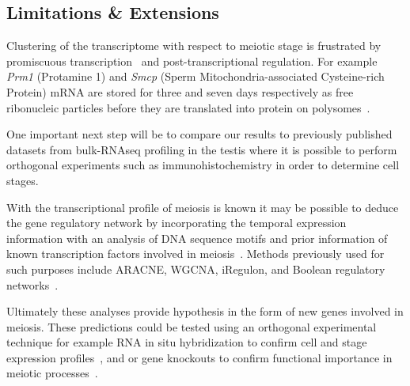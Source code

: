 \subsection{Limitations \& Extensions}
Clustering of the transcriptome with respect to meiotic stage is frustrated by promiscuous transcription~\cite{Soumillon2013Cellular} and post-transcriptional regulation. For example \textit{Prm1} (Protamine 1) and \textit{Smcp} (Sperm Mitochondria-associated Cysteine-rich Protein) mRNA are stored for three and seven days respectively as free ribonucleic particles before they are translated into protein on polysomes~\cite{Cullinane2015Mechanisms, Kleene1984Translational, Kleene2004Patterns}.



One important next step will be to compare our results to previously published datasets from bulk-RNAseq profiling in the testis where it is possible to perform orthogonal experiments such as immunohistochemistry in order to determine cell stages.


With the transcriptional profile of meiosis is known it may be possible to deduce the gene regulatory network by incorporating the temporal expression information with an analysis of DNA sequence motifs and prior information of known transcription factors involved in meiosis~\cite{Padovan-Merhar2013Using, Goutsias2007Computational}. Methods previously used for such purposes include ARACNE, WGCNA, iRegulon, and Boolean regulatory networks~\cite{Margolin2006Reverse, Zhang2005General, Janky2014iRegulon, Moignard2013Characterization}.

Ultimately these analyses provide hypothesis in the form of new genes involved in meiosis. These predictions could be tested using an orthogonal experimental technique for example RNA in situ hybridization to confirm cell and stage expression profiles~\cite{Moffitt2016Highperformance,Choi2016Mapping}, and or gene knockouts to confirm functional importance in meiotic processes~\cite{Jamsai2010Mouse}.
